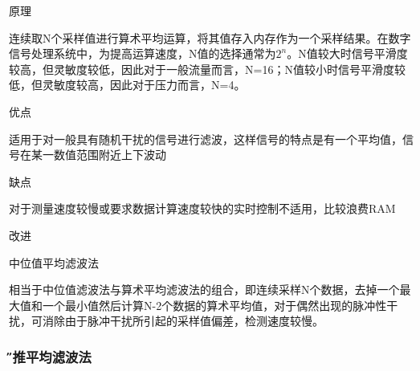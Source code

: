 \documentclass[12pt]{article} %
\begin{document}
 		\begin{compactitem} 
 			\item 原理
 			\par 连续取N个采样值进行算术平均运算，将其值存入内存作为一个采样结果。在数字信号处理系统中，为提高运算速度，N值的选择通常为$2^n$。N值较大时信号平滑度较高，但灵敏度较低，因此对于一般流量而言，N=16；N值较小时信号平滑度较低，但灵敏度较高，因此对于压力而言，N=4。

			\item 优点
			\par 适用于对一般具有随机干扰的信号进行滤波，这样信号的特点是有一个平均值，信号在某一数值范围附近上下波动

			\item 缺点
			\par 对于测量速度较慢或要求数据计算速度较快的实时控制不适用，比较浪费RAM
			
			\item 改进
			\par 中位值平均滤波法
			\par 相当于中位值滤波法与算术平均滤波法的组合，即连续采样N个数据，去掉一个最大值和一个最小值然后计算N-2个数据的算术平均值，对于偶然出现的脉冲性干扰，可消除由于脉冲干扰所引起的采样值偏差，检测速度较慢。
			
			
		 \end{compactitem}	
 		
 		\subsubsection{\H 递推平均滤波法} 
 		
\end{document}
